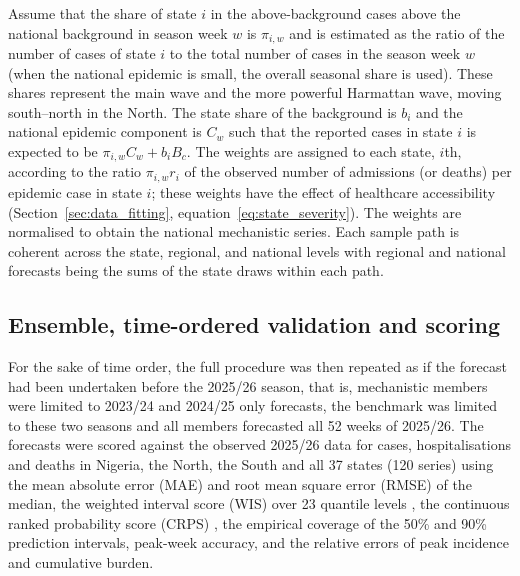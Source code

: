 \documentclass[12pt,a4paper]{article}
\theoremstyle{definition}
\theoremstyle{remark}
\begin{document}
Assume that the share of state $i$ in the above-background cases above the national background in season week $w$ is $\pi_{i,w}$ and is estimated as the ratio of the number of cases of state $i$ to the total number of cases in the season week $w$ (when the national epidemic is small, the overall seasonal share is used). These shares represent the main wave and the more powerful Harmattan wave, moving south–north in the North. The state share of the background is $b_i$ and the national epidemic component is $C_w$ such that the reported cases in state $i$ is expected to be $\pi_{i,w}C_w+b_i B_c$. The weights are assigned to each state, $i$th, according to the ratio $\pi_{i,w}r_i$ of the observed number of admissions (or deaths) per epidemic case in state $i$; these weights have the effect of healthcare accessibility (Section~\ref{sec:data_fitting}, equation~\eqref{eq:state_severity}). The weights are normalised to obtain the national mechanistic series. Each sample path is coherent across the state, regional, and national levels with regional and national forecasts being the sums of the state draws within each path.

\subsection{Ensemble, time-ordered validation and scoring}\label{sec:validation_design}

For the sake of time order, the full procedure was then repeated as if the forecast had been undertaken before the 2025/26 season, that is, mechanistic members were limited to 2023/24 and 2024/25 only forecasts, the benchmark was limited to these two seasons and all members forecasted all 52 weeks of 2025/26. The forecasts were scored against the observed 2025/26 data for cases, hospitalisations and deaths in Nigeria, the North, the South and all 37 states (120 series) using the mean absolute error (MAE) and root mean square error (RMSE) of the median, the weighted interval score (WIS) over 23 quantile levels \cite{bracher2021evaluating}, the continuous ranked probability score (CRPS) \cite{gneiting2007strictly}, the empirical coverage of the 50\% and 90\% prediction intervals, peak-week accuracy, and the relative errors of peak incidence and cumulative burden.
\end{document}
